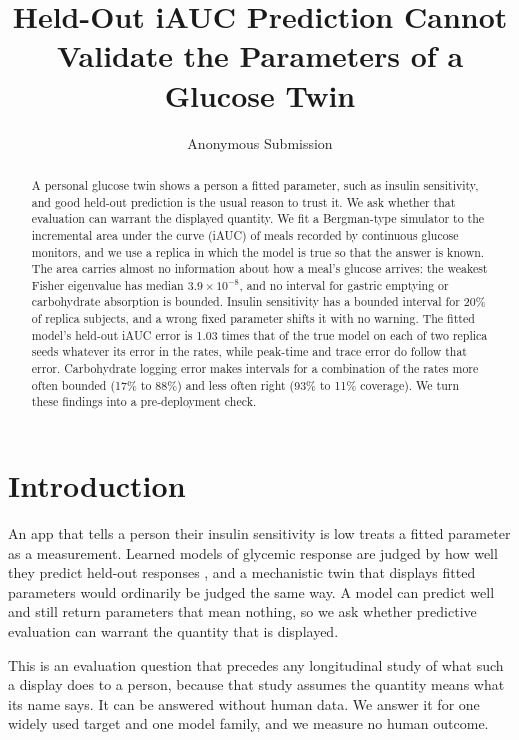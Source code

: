 \documentclass[letterpaper]{article} %
\title{Held-Out iAUC Prediction Cannot Validate the Parameters of a Glucose Twin}
\author{
    Anonymous Submission
}
\newcommand{\resCvThreeQuarterBoundedTau}{88}
\newcommand{\resCvThreeQuarterCoverTau}{11}
\newcommand{\resCvZeroBoundedTau}{17}
\newcommand{\resCvZeroCoverTau}{93}
\newcommand{\resEigMedianOne}{$3.9\times10^{-8}$}
\newcommand{\resPvpRandomZeroRatio}{1.03}
\newcommand{\resSeedsSIBounded}{20}
\begin{document}
\maketitle

\begin{abstract}
A personal glucose twin shows a person a fitted parameter, such as insulin sensitivity, and good held-out prediction is the usual reason to trust it. We ask whether that evaluation can warrant the displayed quantity. We fit a Bergman-type simulator to the incremental area under the curve (iAUC) of meals recorded by continuous glucose monitors, and we use a replica in which the model is true so that the answer is known. The area carries almost no information about how a meal's glucose arrives: the weakest Fisher eigenvalue has median \resEigMedianOne{}, and no interval for gastric emptying or carbohydrate absorption is bounded. Insulin sensitivity has a bounded interval for \resSeedsSIBounded\% of replica subjects, and a wrong fixed parameter shifts it with no warning. The fitted model's held-out iAUC error is \resPvpRandomZeroRatio{} times that of the true model on each of two replica seeds whatever its error in the rates, while peak-time and trace error do follow that error. Carbohydrate logging error makes intervals for a combination of the rates more often bounded (\resCvZeroBoundedTau\% to \resCvThreeQuarterBoundedTau\%) and less often right (\resCvZeroCoverTau\% to \resCvThreeQuarterCoverTau\% coverage). We turn these findings into a pre-deployment check.
\end{abstract}

\section{Introduction}

An app that tells a person their insulin sensitivity is low treats a fitted parameter as a measurement. Learned models of glycemic response are judged by how well they predict held-out responses \citep{zeevi2015personalized,berry2020human}, and a mechanistic twin that displays fitted parameters would ordinarily be judged the same way. A model can predict well and still return parameters that mean nothing, so we ask whether predictive evaluation can warrant the quantity that is displayed.

This is an evaluation question that precedes any longitudinal study of what such a display does to a person, because that study assumes the quantity means what its name says. It can be answered without human data. We answer it for one widely used target and one model family, and we measure no human outcome.
\end{document}
